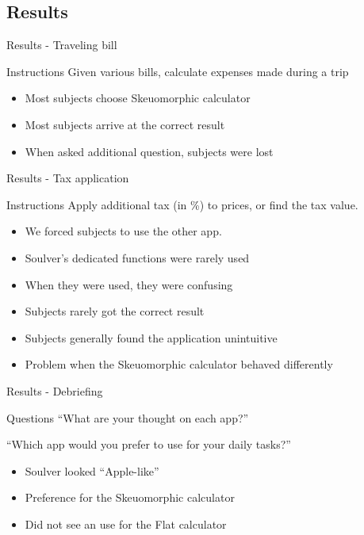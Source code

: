 \documentclass{beamer}
\begin{document}
\subsection{Results}

\begin{frame}{Results - Traveling bill}

    \begin{block}{Instructions}
        Given various bills, calculate expenses made during a trip
    \end{block}

    \begin{itemize}
        \item Most subjects choose Skeuomorphic calculator
        \item Most subjects arrive at the correct result
        \item When asked additional question, subjects were lost
    \end{itemize}

\end{frame}

\begin{frame}{Results - Tax application}

    \begin{block}{Instructions}
        Apply additional tax (in \%) to prices, or find the tax value.
    \end{block}

    \begin{itemize}
        \item We forced subjects to use the other app.
        \item Soulver's dedicated functions were rarely used
        \item When they were used, they were confusing
        \item Subjects rarely got the correct result
        \item Subjects generally found the application unintuitive
        \item Problem when the Skeuomorphic calculator behaved differently
    \end{itemize}

\end{frame}

\begin{frame}{Results - Debriefing}
    \begin{block}{Questions}
        ``What are your thought on each app?''

        ``Which app would you prefer to use for your daily tasks?''
    \end{block}

    \begin{itemize}
        \item Soulver looked ``Apple-like''
        \item Preference for the Skeuomorphic calculator
        \item Did not see an use for the Flat calculator
    \end{itemize}
\end{frame}
\end{document}
